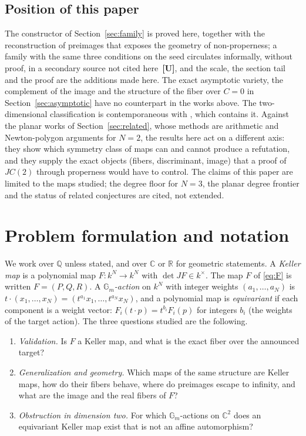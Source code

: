 \documentclass[11pt]{article}
\theoremstyle{definition}
\theoremstyle{remark}
\newcommand{\C}{\mathbb{C}}
\newcommand{\Q}{\mathbb{Q}}
\newcommand{\R}{\mathbb{R}}
\newcommand{\Gm}{\mathbb{G}_m}
\newcommand{\UU}{\textbf{[U]}}
\begin{document}
\subsection{Position of this paper}

The constructor of Section~\ref{sec:family} is proved here, together with the reconstruction of preimages that exposes the geometry of
non-properness; a family with the same three conditions on the seed circulates informally, without proof, in a secondary source not cited here~\UU{}, and the scale, the section tail and the
proof are the additions made here. The exact asymptotic variety, the complement of the image and the structure of the fiber over $C = 0$ in Section~\ref{sec:asymptotic}
have no counterpart in the works above. The two-dimensional classification is contemporaneous with \cite{Shaska2026}, which contains it. Against the planar works of Section~\ref{sec:related}, whose methods are arithmetic and Newton-polygon arguments for $N = 2$, the results here
act on a different axis: they show which symmetry class of maps can and cannot produce a refutation, and they supply the exact objects (fibers, discriminant, image) that a proof of $JC(2)$ through properness would have to control. The claims of this paper
are limited to the maps studied; the degree floor for $N = 3$, the planar degree frontier and the status of related conjectures are cited, not extended.

\section{Problem formulation and notation}\label{sec:problem}

We work over $\Q$ unless stated, and over $\C$ or $\R$ for geometric statements. A \emph{Keller map} is a polynomial
map $F : k^N \to k^N$ with $\det JF \in k^\times$. The map $F$ of \eqref{eq:F} is written $F = (P, Q, R)$. A \emph{$\Gm$-action} on $k^N$ with
integer weights $(a_1, \dots, a_N)$ is $t \cdot (x_1, \dots, x_N) = (t^{a_1} x_1, \dots, t^{a_N} x_N)$, and a polynomial map is
\emph{equivariant} if each component is a weight vector: $F_i(t \cdot p) = t^{b_i} F_i(p)$ for integers $b_i$ (the weights of the target
action). The three questions studied are the following.

\begin{enumerate}
\item \emph{Validation.} Is $F$ a Keller map, and what is the exact fiber over the announced target?
\item \emph{Generalization and geometry.} Which maps of the same structure are Keller maps, how do their fibers behave, where do preimages escape to infinity, and what
are the image and the real fibers of $F$?
\item \emph{Obstruction in dimension two.} For which $\Gm$-actions on $\C^2$ does an equivariant Keller map exist that is not an affine automorphism?
\end{enumerate}
\end{document}
